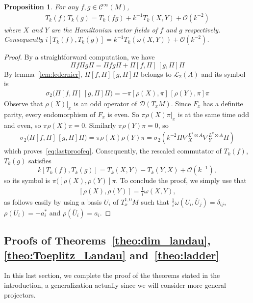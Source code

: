\documentclass[10pt,a4paper]{article}
\newtheorem{prop}[theo]{Proposition}
\theoremstyle{definition}
\numberwithin{equation}{section}
\newcommand{\si}{{\sigma}}
\newcommand{\om}{{\omega}}
\newcommand{\con}{\overline}
\newcommand{\Ci}{{\mathcal{C}}^{\infty}}
\newcommand{\bigo}{\mathcal{O}}
\newcommand{\D}{\mathcal{D}}
\newcommand{\lag}{\mathcal{L}}
\begin{document}
\begin{prop}\label{prop:subsymbolic}
For any $f,g \in \Ci (M)$,
\begin{gather}\label{eq:lastproofeq}
T_{k} (f) T_k (g) = T_k (fg) + k^{-1} T_k (X,Y) + \bigo \left(k^{-2}\right)
\end{gather}
where $X$ and $Y$ are the Hamiltonian vector fields of $f$ and $g$ respectively. Consequently $ i [T_k (f), T_k (g)] = k^{-1} T_k (\om (X,Y)) + \bigo (k^{-2})$.
\end{prop}
\begin{proof}
By a straightforward computation, we have
\[
\Pi f \Pi g \Pi = \Pi fg \Pi + \Pi [f, \Pi]\,[g, \Pi] \Pi
\]
By lemma~\ref{lem:ledernier}, $\Pi [f, \Pi] [g, \Pi] \Pi$ belongs to $\lag_2 (A)$ and its symbol is
\begin{gather*}
\si_2 \big(\Pi [f, \Pi]\,[g, \Pi] \Pi\big) = - \pi [\rho (X), \pi]\,[\rho (Y),
\pi] \pi
\end{gather*}
Observe that $\rho (X) |_x$ is an odd operator of $\D (T_xM)$. Since $F_x$ has a definite parity, every endomorphism of $F_x$ is even. So $\pi \rho (X)
\pi |_x$ is at the same time odd and even, so $\pi \rho (X) \pi =0$.  Similarly $\pi \rho (Y) \pi =0$, so
\begin{gather*}
\si_2 \big(\Pi [f, \Pi]\,[g, \Pi] \Pi\big) = \pi \rho (X) \rho (Y) \pi = \si_2 \left(k^{-2} \Pi \nabla_X^{L^k \otimes A} \nabla_Y^{L^k \otimes A} \Pi\right)
\end{gather*}
which proves~\eqref{eq:lastproofeq}. Consequently, the rescaled commutator of $T_k(f)$, $T_k(g)$ satisfies
\[
k \left[T_k (f), T_k (g)\right] = T_k (X, Y) - T_k (Y,X) + \bigo \left(k^{-1}\right),
\]
so its symbol is $\pi ([\rho (X), \rho (Y)] \pi$. To conclude the proof, we simply use that
\begin{gather}\label{eq:commutator_rho}
\left[\rho (X), \rho (Y)\right] = \tfrac{1}{i} \om (X,Y),
\end{gather}
as follows easily by using a basis $U_i$ of $T_x^{1,0}M$ such that $\frac{1}{i} \om (U_i, \con{U}_j) = \delta_{ij}$, $\rho (U_i) = - a_i^*$ and $\rho (\con{U}_i) = a_i$.
\end{proof}


\subsection{Proofs of Theorems~\ref{theo:dim_landau}, \ref{theo:Toeplitz_Landau} and~\ref{theo:ladder}} \label{sec:ledernier}

In this last section, we complete the proof of the theorems stated in the introduction, a generalization actually since we will consider more general projectors.
\end{document}
